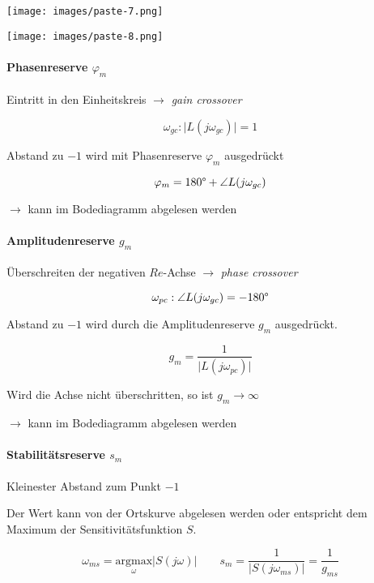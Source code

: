 \documentclass[
  10pt,
  a4paper,
  twocolumn]{article}
\let\oldparagraph\paragraph
\renewcommand{\paragraph}[1]{\oldparagraph{#1}\mbox{}}
\numberwithin{equation}{section}
\let\paragraph\oldparagraph
\renewcommand{\paragraph}[1]{\oldparagraph{#1}\mbox{}\par}
\begin{document}
\texttt{[image: images/paste-7.png]}

\texttt{[image: images/paste-8.png]}

\paragraph{\texorpdfstring{Phasenreserve
\(\varphi_m\)}{Phasenreserve \textbackslash varphi\_m}}\label{phasenreserve-varphi_m}

Eintritt in den Einheitskreis \(\rightarrow\) \emph{gain crossover}

\[
\omega_{gc} : \lvert L(j\omega_{gc})\rvert = 1
\]

Abstand zu \(-1\) wird mit Phasenreserve \(\varphi_m\) ausgedrückt

\[
\varphi_m = 180\degree+\angle L(j\omega_{gc})
\]

\(\rightarrow\) kann im Bodediagramm abgelesen werden

\paragraph{\texorpdfstring{Amplitudenreserve
\(g_m\)}{Amplitudenreserve g\_m}}\label{amplitudenreserve-g_m}

Überschreiten der negativen \(Re\)-Achse \(\rightarrow\) \emph{phase
crossover}

\[
\omega_{pc} : \angle L(j\omega_{gc})= -180\degree
\]

Abstand zu \(-1\) wird durch die Amplitudenreserve \(g_m\) ausgedrückt.

\[
g_m = \frac1{\lvert L(j\omega_{pc})\rvert}
\]

Wird die Achse nicht überschritten, so ist \(g_m\rightarrow\infty\)

\(\rightarrow\) kann im Bodediagramm abgelesen werden

\paragraph{\texorpdfstring{Stabilitätsreserve
\(s_m\)}{Stabilitätsreserve s\_m}}\label{stabilituxe4tsreserve-s_m}

Kleinester Abstand zum Punkt \(-1\)

Der Wert kann von der Ortskurve abgelesen werden oder entspricht dem
Maximum der Sensitivitätsfunktion \(S\).

\[
\omega_{ms} = \underset{\omega}{\text{argmax}}\lvert S(j\omega)\rvert\qquad s_m = \frac1{\lvert S(j\omega_{ms})\rvert}=\frac1{g_{ms}}
\]
\end{document}
